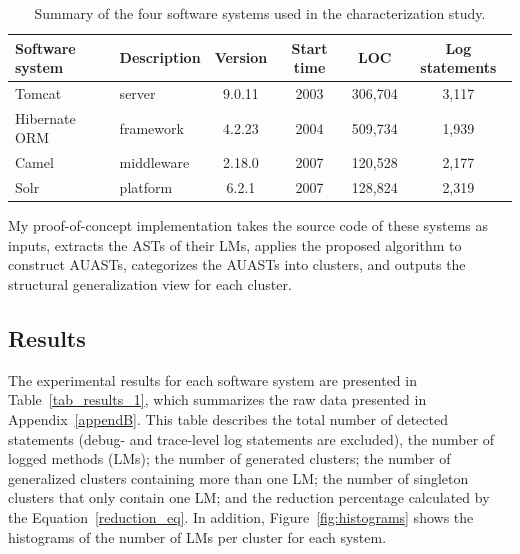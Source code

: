 

\begin{table} [H]
  \centering
  \begin{tabular}{llcccc}
    \toprule
    \textbf{Software system}  & \textbf{Description}   & \textbf{Version} & \textbf{Start time} & \textbf{LOC} & \textbf{Log statements} \\ \hline
    {Tomcat} & server  & 9.0.11& 2003 &306,704 &  3,117 \\ \hline
{Hibernate ORM} & framework & 4.2.23 & 2004 & 509,734 & 1,939 \\ \hline
    {Camel} &  middleware & 2.18.0 &  2007 &120,528 & 2,177 \\
    \hline
    {Solr} &  platform  & 6.2.1 &  2007 & 128,824 & 2,319 \\
    \toprule
  \end{tabular}
    \caption{Summary of the four software systems used in the characterization study.}
\label{table:CSts}
\end{table}


My proof-of-concept implementation takes the source code of these systems as inputs, extracts the ASTs of their LMs, applies the proposed algorithm to construct AUASTs, categorizes the AUASTs into clusters, and outputs the structural generalization view for each cluster.


\subsection{Results}  \label{results-characterization}
The experimental results for each software system are presented in Table~\ref{tab_results_1}, which summarizes the raw data presented in Appendix~\ref{appendB}. This table describes the total number of detected  statements (debug- and trace-level log statements are excluded), the number of logged methods (LMs); the number of generated clusters; the number of generalized clusters containing more than one LM; the number of singleton clusters that only contain one LM; and the reduction percentage calculated by the Equation~\ref{reduction_eq}. In addition, Figure~\ref{fig:histograms} shows the histograms of the number of LMs per cluster for each system.


